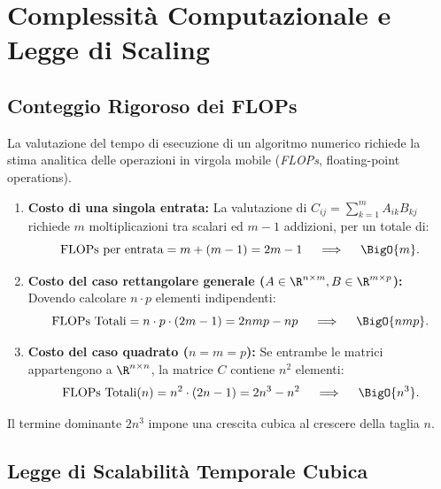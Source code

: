 \FloatBarrier
\section{Complessit\`a Computazionale e Legge di Scaling}

\subsection{Conteggio Rigoroso dei FLOPs}

La valutazione del tempo di esecuzione di un algoritmo numerico richiede la stima analitica delle operazioni in virgola mobile (\textit{FLOPs}, floating-point operations).

\begin{property}
\mbox{}\par\nopagebreak
\begin{enumerate}
    \item \textbf{Costo di una singola entrata:}
    La valutazione di $C_{ij} = \sum_{k=1}^m A_{ik} B_{kj}$ richiede $m$ moltiplicazioni tra scalari ed $m - 1$ addizioni, per un totale di:
    \begin{equation}
        \text{FLOPs per entrata} = m + (m - 1) = 2m - 1 \quad \implies \quad \BigO{m}.
    \end{equation}
    \item \textbf{Costo del caso rettangolare generale ($A \in \R^{n \times m}, B \in \R^{m \times p}$):}
    Dovendo calcolare $n \cdot p$ elementi indipendenti:
    \begin{equation}
        \text{FLOPs Totali} = n \cdot p \cdot (2m - 1) = 2nmp - np \quad \implies \quad \BigO{nmp}.
    \end{equation}
    \item \textbf{Costo del caso quadrato ($n = m = p$):}
    Se entrambe le matrici appartengono a $\R^{n \times n}$, la matrice $C$ contiene $n^2$ elementi:
    \begin{equation}
        \text{FLOPs Totali}(n) = n^2 \cdot (2n - 1) = 2n^3 - n^2 \quad \implies \quad \BigO{n^3}.
    \end{equation}
\end{enumerate}
\end{property}

Il termine dominante $2n^3$ impone una crescita cubica al crescere della taglia $n$.

\subsection{Legge di Scalabilit\`a Temporale Cubica}


